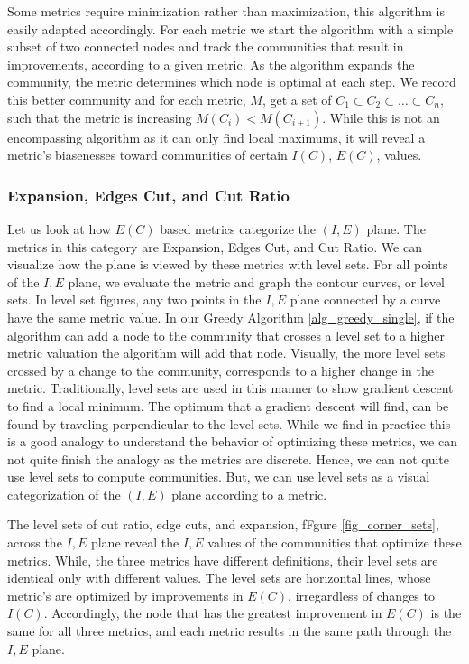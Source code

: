 \documentclass[phd,tocprelim]{cornell}
\begin{document}
Some metrics require minimization rather than maximization, this algorithm is easily adapted accordingly.
For each metric we start the algorithm with a simple subset of two connected nodes and track the communities that result in improvements, according to a given metric. As the algorithm expands the community, the metric determines which node is optimal at each step. We record this better community and for each metric, $M$, get a set of $C_1 \subset C_2 \subset \dots \subset C_n$, such that the metric is increasing $M(C_i) < M(C_{i+1})$. While this is not an encompassing algorithm as it can only find local maximums, it will reveal a metric’s biasenesses toward communities of certain $I(C)$, $E(C)$, values.

\subsubsection{Expansion, Edges Cut, and Cut Ratio}

Let us look at how $E(C)$ based metrics categorize the $(I, E)$ plane.  The metrics in this category are {\sc Expansion}, {\sc Edges Cut}, and {\sc Cut Ratio}.  We can visualize how the plane is viewed by these metrics with level sets.  For all points of the $I,E$ plane, we evaluate the metric and graph the contour curves, or level sets\cite{}.  In level set figures, any two points in the $I,E$ plane connected by a curve have the same metric value. In our Greedy Algorithm \ref{alg_greedy_single}, if the algorithm can add a node to the community that crosses a level set to a higher metric valuation the algorithm will add that node.  Visually, the more level sets crossed by a change to the community, corresponds to a higher change in the metric.  Traditionally, level sets are used in this manner to show gradient descent to find a local minimum.  The optimum that a gradient descent will find, can be found by traveling perpendicular to the level sets.  While we find in practice this is a good analogy to understand the behavior of optimizing these metrics,  we can not quite finish the analogy as the metrics are discrete.  Hence, we can not quite use level sets to compute communities.  But, we can use level sets as a visual categorization of the $(I, E)$ plane according to a metric.


The level sets of cut ratio, edge cuts, and expansion, fFgure \ref{fig_corner_sets}, across the $I,E$ plane reveal the $I,E$ values of the communities that optimize these metrics.  While, the three metrics have different definitions, their level sets are identical only with different values.  The level sets are horizontal lines, whose metric's are optimized by improvements in $E(C)$, irregardless of changes to $I(C)$.  Accordingly, the node that has the greatest improvement in $E(C)$ is the same for all three metrics, and each metric results in the same path through the $I,E$ plane.
\end{document}
